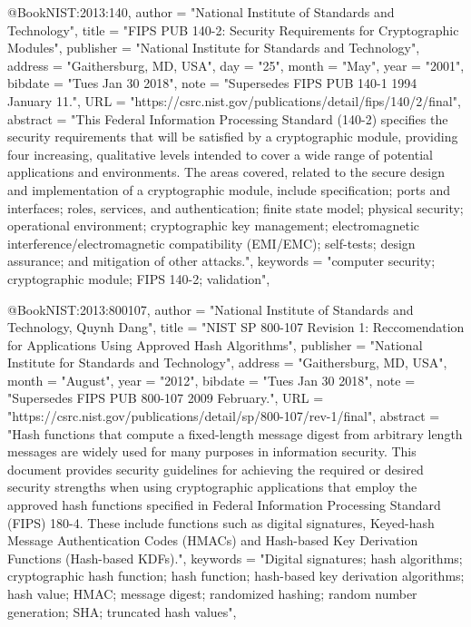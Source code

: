 @Book{NIST:2013:140,
  author =       "{National Institute of Standards and Technology}",
  title =        "{FIPS PUB 140-2}: Security Requirements for Cryptographic Modules",
  publisher =    "National Institute for Standards and Technology",
  address =      "Gaithersburg, MD, USA",
  day =          "25",
  month =        "May",
  year =         "2001",
  bibdate =      "Tues Jan 30 2018",
  note =         "Supersedes FIPS PUB 140-1 1994 January 11.",
  URL =          "https://csrc.nist.gov/publications/detail/fips/140/2/final",
  abstract =     "This Federal Information Processing Standard (140-2) specifies the security requirements that will be satisfied by a cryptographic module, providing four increasing, qualitative levels intended to cover a wide range of potential applications and environments. The areas covered, related to the secure design and implementation of a cryptographic module, include specification; ports and interfaces; roles, services, and authentication; finite state model; physical security; operational environment; cryptographic key management; electromagnetic interference/electromagnetic compatibility (EMI/EMC); self-tests; design assurance; and mitigation of other attacks.",
  keywords =     "computer security; cryptographic module; FIPS 140-2; validation",
}

@Book{NIST:2013:800107,
  author =       "{National Institute of Standards and Technology}, {Quynh Dang}",
  title =        "{NIST SP 800-107 Revision 1}: Reccomendation for Applications Using Approved Hash Algorithms",
  publisher =    "National Institute for Standards and Technology",
  address =      "Gaithersburg, MD, USA",
  month =        "August",
  year =         "2012",
  bibdate =      "Tues Jan 30 2018",
  note =         "Supersedes FIPS PUB 800-107 2009 February.",
  URL =          "https://csrc.nist.gov/publications/detail/sp/800-107/rev-1/final",
  abstract =     "Hash functions that compute a fixed-length message digest from arbitrary length messages are widely used for many purposes in information security. This document provides security guidelines for achieving the required or desired security strengths when using cryptographic applications that employ the approved hash functions specified in Federal Information Processing Standard (FIPS) 180-4. These include functions such as digital signatures, Keyed-hash Message Authentication Codes (HMACs) and Hash-based Key Derivation Functions (Hash-based KDFs).",
  keywords =     "Digital signatures; hash algorithms; cryptographic hash function; hash function; hash-based key derivation algorithms; hash value; HMAC; message digest; randomized hashing; random number generation; SHA; truncated hash values",
}

